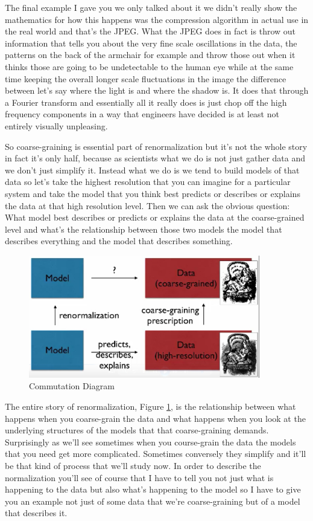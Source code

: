 \documentclass[]{article}
\begin{document}
The final example I gave you we only talked about
it we didn't really show the mathematics
for how this happens was the compression
algorithm in actual use in the real
world and that's the JPEG. What the JPEG
does in fact is throw out information
that tells you about the very
fine scale oscillations in the data, the
patterns on the back of the armchair for
example and throw those out when it
thinks those are going to be
undetectable to the human eye while at
the same time keeping the overall longer
scale fluctuations in the image the
difference between let's say where the
light is and where the shadow is. It does
that through a Fourier transform and
essentially all it really does is just
chop off the high frequency components
in a way that engineers have decided is
at least not entirely visually unpleasing.

 So coarse-graining is
essential part of renormalization but it's
not the whole story in fact it's only
half, because as scientists what we do is
not just gather data and we don't just
simplify it. Instead what we do is we
tend to build models of that data so
let's take the highest resolution that
you can imagine for a particular system
and take the model that you think best
predicts or describes or explains the
data at that high resolution level. Then
we can ask the obvious question: What
model best describes or predicts or
explains the data at the coarse-grained
level and what's the relationship
between those two models the model that
describes everything and the model that
describes something. 

\begin{figure}[H]
	\caption{Commutation Diagram}\label{fig:commutation}
	\includegraphics[width=0.9\textwidth]{commutation}
\end{figure}

The entire story of
renormalization, Figure \ref{fig:commutation}, is the relationship
between what happens when you
coarse-grain the data and what happens
when you look at the underlying
structures of the models that that
coarse-graining demands. Surprisingly as
we'll see sometimes when you course-grain the data the models that you need
get more complicated. Sometimes
conversely they simplify and it'll be
that kind of process that we'll study
now. In order to describe the
normalization you'll see of course that
I have to tell you not just what is
happening to the data but also what's
happening to the model so I have to give
you an example not just of some data
that we're coarse-graining but of a model
that describes it.
\end{document}
